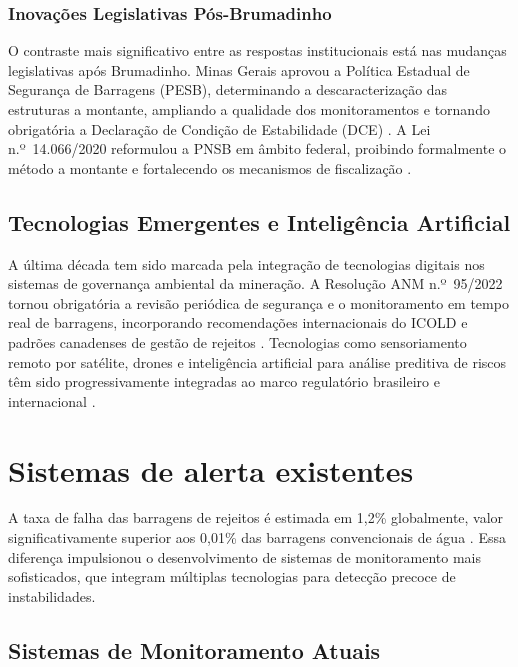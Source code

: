 \subsubsection{Inovações Legislativas Pós-Brumadinho}

O contraste mais significativo entre as respostas institucionais está nas mudanças legislativas após Brumadinho. Minas Gerais aprovou a Política Estadual de Segurança de Barragens (PESB), determinando a descaracterização das estruturas a montante, ampliando a qualidade dos monitoramentos e tornando obrigatória a Declaração de Condição de Estabilidade (DCE) \cite{minasgerais2024historico}. A Lei n.º~14.066/2020 reformulou a PNSB em âmbito federal, proibindo formalmente o método a montante e fortalecendo os mecanismos de fiscalização \cite{brasil2020lei14066}.

\subsection{Tecnologias Emergentes e Inteligência Artificial}

A última década tem sido marcada pela integração de tecnologias digitais nos sistemas de governança ambiental da mineração. A Resolução ANM n.º~95/2022 tornou obrigatória a revisão periódica de segurança e o monitoramento em tempo real de barragens, incorporando recomendações internacionais do ICOLD e padrões canadenses de gestão de rejeitos \cite{anm2022resolucao95, icold2022tailings, mac2021guide}. Tecnologias como sensoriamento remoto por satélite, drones e inteligência artificial para análise preditiva de riscos têm sido progressivamente integradas ao marco regulatório brasileiro e internacional \cite{darzi2024transformacao}.

\section{Sistemas de alerta existentes}
\label{sec:sistema_alerta}

A taxa de falha das barragens de rejeitos é estimada em 1,2\% globalmente, valor significativamente superior aos 0,01\% das barragens convencionais de água \cite{stocks2019tailings}. Essa diferença impulsionou o desenvolvimento de sistemas de monitoramento mais sofisticados, que integram múltiplas tecnologias para detecção precoce de instabilidades.

\subsection{Sistemas de Monitoramento Atuais}


